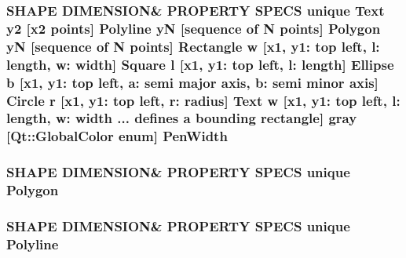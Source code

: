 \subsubsection[{\texorpdfstring{Pen\+Width}{PenWidth}}]{\setlength{\rightskip}{0pt plus 5cm}S\+H\+A\+PE D\+I\+M\+E\+N\+S\+I\+ON\& P\+R\+O\+P\+E\+R\+TY S\+P\+E\+CS unique {\bf Text} {\bf y2} \mbox{[}{\bf x2} points\mbox{]} {\bf Polyline} yN \mbox{[}sequence of N points\mbox{]} {\bf Polygon} yN \mbox{[}sequence of N points\mbox{]} {\bf Rectangle} w \mbox{[}{\bf x1}, y1\+: top left, l\+: length, w\+: width\mbox{]} {\bf Square} {\bf l} \mbox{[}{\bf x1}, y1\+: top left, l\+: length\mbox{]} {\bf Ellipse} b \mbox{[}{\bf x1}, y1\+: top left, a\+: semi major axis, b\+: semi minor axis\mbox{]} {\bf Circle} r \mbox{[}{\bf x1}, y1\+: top left, r\+: radius\mbox{]} {\bf Text} w \mbox{[}{\bf x1}, y1\+: top left, l\+: length, w\+: width ... defines {\bf a} bounding rectangle\mbox{]} gray \mbox{[}Qt\+::\+Global\+Color enum\mbox{]} Pen\+Width}\hypertarget{shape__input__file__specs_8txt_ac9be3af6537ae5a8802a4af83fcffb8c}{}\label{shape__input__file__specs_8txt_ac9be3af6537ae5a8802a4af83fcffb8c}
\subsubsection[{\texorpdfstring{Polygon}{Polygon}}]{\setlength{\rightskip}{0pt plus 5cm}S\+H\+A\+PE D\+I\+M\+E\+N\+S\+I\+ON\& P\+R\+O\+P\+E\+R\+TY S\+P\+E\+CS unique {\bf Polygon}}\hypertarget{shape__input__file__specs_8txt_a04e906b8dbbb27ddcde493daa87543f4}{}\label{shape__input__file__specs_8txt_a04e906b8dbbb27ddcde493daa87543f4}
\subsubsection[{\texorpdfstring{Polyline}{Polyline}}]{\setlength{\rightskip}{0pt plus 5cm}S\+H\+A\+PE D\+I\+M\+E\+N\+S\+I\+ON\& P\+R\+O\+P\+E\+R\+TY S\+P\+E\+CS unique {\bf Polyline}}\hypertarget{shape__input__file__specs_8txt_a7f7aae76d6fc1caf3d692a8b6bb9a9b7}{}\label{shape__input__file__specs_8txt_a7f7aae76d6fc1caf3d692a8b6bb9a9b7}
